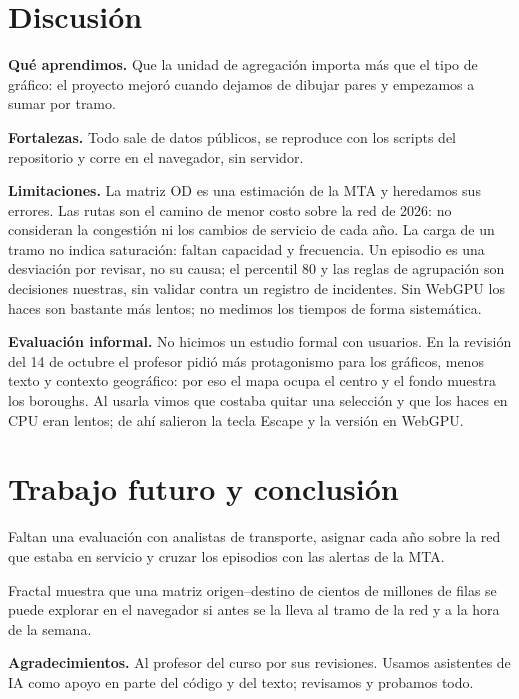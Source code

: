 \documentclass[conference,a4paper]{IEEEtran}
\begin{document}
\section{Discusión}
\textbf{Qué aprendimos.} Que la unidad de agregación importa más que el tipo de gráfico: el proyecto mejoró cuando dejamos de dibujar pares y empezamos a sumar por tramo.

\textbf{Fortalezas.} Todo sale de datos públicos, se reproduce con los scripts del repositorio y corre en el navegador, sin servidor.

\textbf{Limitaciones.} La matriz OD es una estimación de la MTA y heredamos sus errores. Las rutas son el camino de menor costo sobre la red de 2026: no consideran la congestión ni los cambios de servicio de cada año. La carga de un tramo no indica saturación: faltan capacidad y frecuencia. Un episodio es una desviación por revisar, no su causa; el percentil 80 y las reglas de agrupación son decisiones nuestras, sin validar contra un registro de incidentes. Sin WebGPU los haces son bastante más lentos; no medimos los tiempos de forma sistemática.

\textbf{Evaluación informal.} No hicimos un estudio formal con usuarios. En la revisión del 14 de octubre el profesor pidió más protagonismo para los gráficos, menos texto y contexto geográfico: por eso el mapa ocupa el centro y el fondo muestra los boroughs. Al usarla vimos que costaba quitar una selección y que los haces en CPU eran lentos; de ahí salieron la tecla Escape y la versión en WebGPU.

\section{Trabajo futuro y conclusión}
Faltan una evaluación con analistas de transporte, asignar cada año sobre la red que estaba en servicio y cruzar los episodios con las alertas de la MTA.

Fractal muestra que una matriz origen--destino de cientos de millones de filas se puede explorar en el navegador si antes se la lleva al tramo de la red y a la hora de la semana.

\textbf{Agradecimientos.} Al profesor del curso por sus revisiones. Usamos asistentes de IA como apoyo en parte del código y del texto; revisamos y probamos todo.
\end{document}
